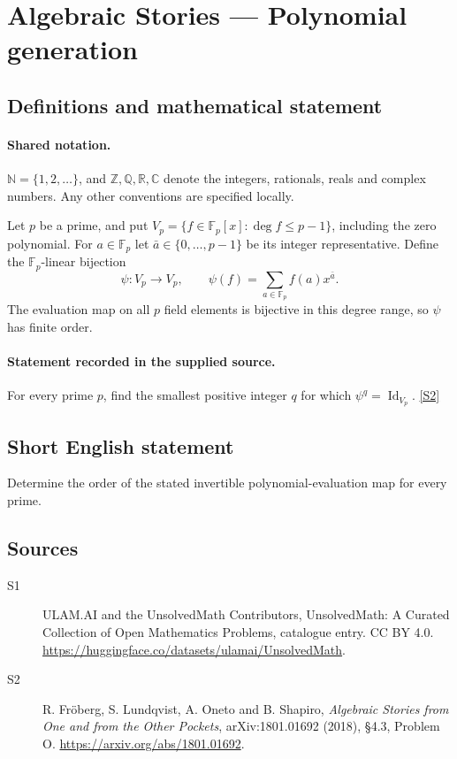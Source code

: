 \documentclass[11pt]{article}
\newcommand{\sref}[2]{\hyperlink{source:#1:#2}{[S#2]}}
\begin{document}
\section{Algebraic Stories — Polynomial generation}\label{statement}

\subsection{Definitions and mathematical statement}

\paragraph{Shared notation.}$\mathbb N=\{1,2,\ldots\}$, and $\mathbb Z,\mathbb Q,\mathbb R,\mathbb C$ denote the integers, rationals, reals and complex numbers. Any other conventions are specified locally.


Let $p$ be a prime, and put $V_p=\{f\in\mathbb F_p[x]:\deg f\leq p-1\}$, including the zero polynomial. For $a\in\mathbb F_p$ let $\bar a\in\{0,\ldots,p-1\}$ be its integer representative. Define the $\mathbb F_p$-linear bijection
\[\psi:V_p\longrightarrow V_p,\qquad\psi(f)=\sum_{a\in\mathbb F_p}f(a)x^{\bar a}.
\]
The evaluation map on all $p$ field elements is bijective in this degree range, so $\psi$ has finite order.
\paragraph{Statement recorded in the supplied source.}
For every prime $p$, find the smallest positive integer $q$ for which $\psi^q=\operatorname{Id}_{V_p}$. \sref{statement}{2}
\subsection{Short English statement}
Determine the order of the stated invertible polynomial-evaluation map for every prime.
\subsection{Sources}
\begin{description}
\item[\hypertarget{source:statement:1}{S1}] ULAM.AI and the UnsolvedMath Contributors, UnsolvedMath: A Curated Collection of Open Mathematics Problems, catalogue entry. CC BY 4.0. \url{https://huggingface.co/datasets/ulamai/UnsolvedMath}.
\item[\hypertarget{source:statement:2}{S2}] R. Fröberg, S. Lundqvist, A. Oneto and B. Shapiro, \emph{Algebraic Stories from One and from the Other Pockets}, arXiv:1801.01692 (2018), §4.3, Problem O. \url{https://arxiv.org/abs/1801.01692}.
\end{description}
\label{end:statement}
\end{document}
